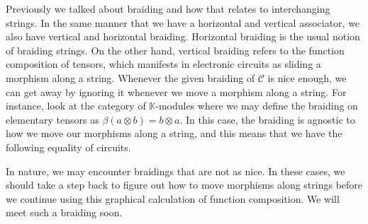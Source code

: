 \documentclass[../thesis.tex]{subfiles}
\begin{document}
            Previously we talked about braiding and how that relates to interchanging strings. In the same manner that we have a horizontal and vertical associator, we also have vertical and horizontal braiding. Horizontal braiding is the usual notion of braiding strings. On the other hand, vertical braiding refers to the function composition of tensors, which manifests in electronic circuits as sliding a morphism along a string. Whenever the given braiding of $\mathcal{C}$ is nice enough, we can get away by ignoring it whenever we move a morphism along a string. For instance, look at the category of $\mathbb{K}$-modules where we may define the braiding on elementary tensors as $\beta (a\otimes b) = b\otimes a$. In this case, the braiding is agnostic to how we move our morphisms along a string, and this means that we have the following equality of circuits.
            \begin{center}
            \end{center}

            In nature, we may encounter braidings that are not as nice. In these cases, we should take a step back to figure out how to move morphisms along strings before we continue using this graphical calculation of function composition. We will meet such a braiding soon.
            
\end{document}
